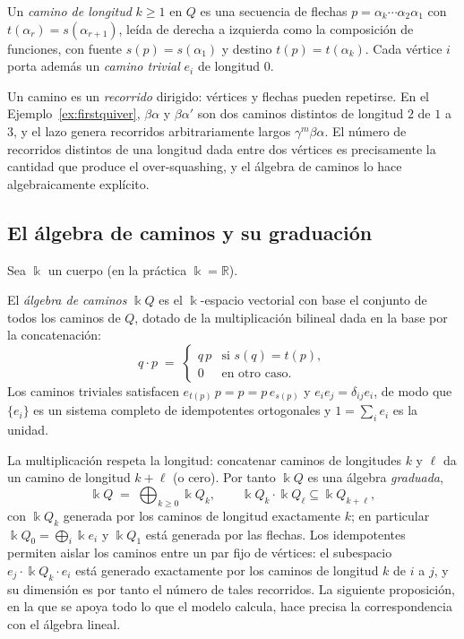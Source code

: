 \documentclass[runningheads]{llncs}
\newcommand{\kk}{\Bbbk}
\newcommand{\kQ}{\kk Q}
\newcommand{\RR}{\mathbb{R}}
\begin{document}
\begin{definition}
Un \emph{camino de longitud} $k\ge1$ en $Q$ es una secuencia de flechas
$p=\alpha_k\cdots\alpha_2\alpha_1$ con $t(\alpha_r)=s(\alpha_{r+1})$, leída de
derecha a izquierda como la composición de funciones, con fuente
$s(p)=s(\alpha_1)$ y destino $t(p)=t(\alpha_k)$. Cada vértice $i$ porta además
un \emph{camino trivial} $e_i$ de longitud $0$.
\end{definition}

Un camino es un \emph{recorrido} dirigido: vértices y flechas pueden repetirse.
En el Ejemplo~\ref{ex:firstquiver}, $\beta\alpha$ y $\beta\alpha'$ son dos
caminos distintos de longitud $2$ de $1$ a $3$, y el lazo genera recorridos
arbitrariamente largos $\gamma^m\beta\alpha$. El número de recorridos distintos
de una longitud dada entre dos vértices es precisamente la cantidad que produce
el over-squashing, y el álgebra de caminos lo hace algebraicamente explícito.

\subsection{El álgebra de caminos y su graduación}

Sea $\kk$ un cuerpo (en la práctica $\kk=\RR$).

\begin{definition}
El \emph{álgebra de caminos} $\kQ$ es el $\kk$-espacio vectorial con base el
conjunto de todos los caminos de $Q$, dotado de la multiplicación bilineal dada
en la base por la concatenación:
\[
  q\cdot p \;=\;
  \begin{cases}
    q\,p & \text{si } s(q)=t(p),\\[2pt]
    0 & \text{en otro caso.}
  \end{cases}
\]
Los caminos triviales satisfacen $e_{t(p)}\,p=p=p\,e_{s(p)}$ y
$e_ie_j=\delta_{ij}e_i$, de modo que $\{e_i\}$ es un sistema completo de
idempotentes ortogonales y $1=\sum_i e_i$ es la unidad.
\end{definition}

La multiplicación respeta la longitud: concatenar caminos de longitudes $k$ y
$\ell$ da un camino de longitud $k+\ell$ (o cero). Por tanto $\kQ$ es una
álgebra \emph{graduada},
\[
  \kQ \;=\; \bigoplus_{k\ge 0}\kQ_k,
  \qquad \kQ_k\cdot \kQ_\ell \subseteq \kQ_{k+\ell},
\]
con $\kQ_k$ generada por los caminos de longitud exactamente $k$; en particular
$\kQ_0=\bigoplus_i\kk e_i$ y $\kQ_1$ está generada por las flechas. Los
idempotentes permiten aislar los caminos entre un par fijo de vértices: el
subespacio $e_j\cdot\kQ_k\cdot e_i$ está generado exactamente por los caminos
de longitud $k$ de $i$ a $j$, y su dimensión es por tanto el número de tales
recorridos. La siguiente proposición, en la que se apoya todo lo que el modelo
calcula, hace precisa la correspondencia con el álgebra lineal.
\end{document}
